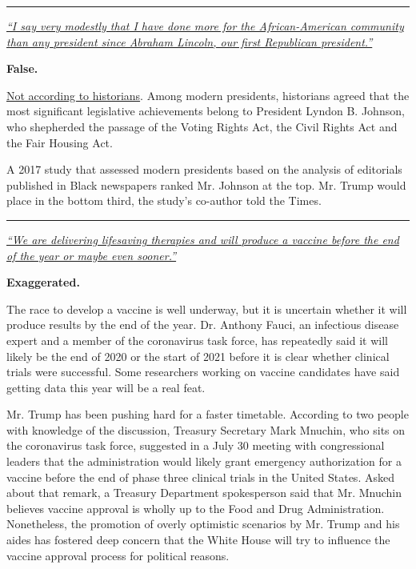 \begin{center}\rule{0.5\linewidth}{\linethickness}\end{center}

\href{https://www.nytimes3xbfgragh.onion/live/2020/08/27/us/rnc-fact-check\#i-say-very-modestly-that-i-have-done-more-for-the-african-american-community-than-any-president-since-abraham-lincoln-our-first-}{\emph{``I
say very modestly that I have done more for the African-American
community than any president since Abraham Lincoln, our first Republican
president.''}}

\textbf{False.}

\href{https://www.nytimes3xbfgragh.onion/2020/06/05/us/politics/trump-black-african-americans-fact-check.html}{Not
according to historians}. Among modern presidents, historians agreed
that the most significant legislative achievements belong to President
Lyndon B. Johnson, who shepherded the passage of the Voting Rights Act,
the Civil Rights Act and the Fair Housing Act.

A 2017 study that assessed modern presidents based on the analysis of
editorials published in Black newspapers ranked Mr. Johnson at the top.
Mr. Trump would place in the bottom third, the study's co-author told
the Times.

\begin{center}\rule{0.5\linewidth}{\linethickness}\end{center}

\href{https://www.nytimes3xbfgragh.onion/live/2020/08/27/us/rnc-fact-check\#we-are-delivering-lifesaving-therapies-and-will-produce-a-vaccine-before-the-end-of-the-year-or-maybe-even-sooner}{\emph{``We
are delivering lifesaving therapies and will produce a vaccine before
the end of the year or maybe even sooner.''}}

\textbf{Exaggerated.}

The race to develop a vaccine is well underway, but it is uncertain
whether it will produce results by the end of the year. Dr. Anthony
Fauci, an infectious disease expert and a member of the coronavirus task
force, has repeatedly said it will likely be the end of 2020 or the
start of 2021 before it is clear whether clinical trials were
successful. Some researchers working on vaccine candidates have said
getting data this year will be a real feat.

Mr. Trump has been pushing hard for a faster timetable. According to two
people with knowledge of the discussion, Treasury Secretary Mark
Mnuchin, who sits on the coronavirus task force, suggested in a July 30
meeting with congressional leaders that the administration would likely
grant emergency authorization for a vaccine before the end of phase
three clinical trials in the United States. Asked about that remark, a
Treasury Department spokesperson said that Mr. Mnuchin believes vaccine
approval is wholly up to the Food and Drug Administration. Nonetheless,
the promotion of overly optimistic scenarios by Mr. Trump and his aides
has fostered deep concern that the White House will try to influence the
vaccine approval process for political reasons.

